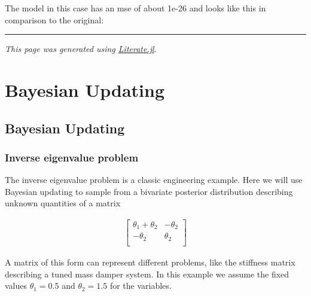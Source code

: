 The model in this case has an mse of about 1e-26 and looks like this in comparison to the original:





\begin{figure}
\centering
{}
\caption{}
\end{figure}




{\rule{\textwidth}{1pt}}


\emph{This page was generated using \href{https://github.com/fredrikekre/Literate.jl}{Literate.jl}.}



\chapter{Bayesian Updating}


\section{Bayesian Updating}



\label{16081037215275166927}{}


\subsection{Inverse eigenvalue problem}



\label{15653452312877879055}{}


The inverse eigenvalue problem is a classic engineering example. Here we will use Bayesian updating to sample from a bivariate posterior distribution describing unknown quantities of a matrix



\begin{equation*}
\begin{split}\begin{bmatrix}
 \theta_1 + \theta_2 & -\theta_2 \\
 -\theta_2 & \theta_2 \\
\end{bmatrix}\end{split}\end{equation*}


A matrix of this form can represent different problems, like the stiffness matrix describing a tuned mass damper system. In this example we assume the fixed values \(\theta_1 = 0.5\) and \(\theta_2 = 1.5\) for the variables.



